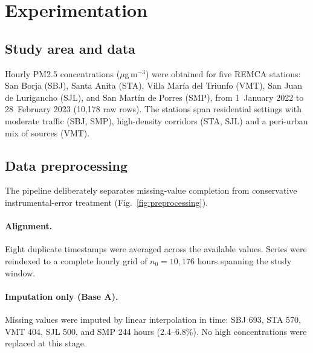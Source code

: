 \documentclass[12pt,letterpaper]{article}
\begin{document}
\section{Experimentation}
\label{sec:methods}

\subsection{Study area and data}
\label{subsec:data}

Hourly PM2.5 concentrations ($\mu$g\,m$^{-3}$) were obtained for five REMCA stations: San Borja (SBJ), Santa Anita (STA), Villa Mar\'ia del Triunfo (VMT), San Juan de Lurigancho (SJL), and San Mart\'in de Porres (SMP), from 1~January 2022 to 28~February 2023 (10{,}178 raw rows). The stations span residential settings with moderate traffic (SBJ, SMP), high-density corridors (STA, SJL) and a peri-urban mix of sources (VMT).

\subsection{Data preprocessing}
\label{subsec:preproc}

The pipeline deliberately separates missing-value completion from conservative instrumental-error treatment (Fig.~\ref{fig:preprocessing}).

\paragraph{Alignment.}
Eight duplicate timestamps were averaged across the available values. Series were reindexed to a complete hourly grid of $n_0=10{,}176$ hours spanning the study window.

\paragraph{Imputation only (Base A).}
Missing values were imputed by linear interpolation in time: SBJ 693, STA 570, VMT 404, SJL 500, and SMP 244 hours (2.4--6.8\%). No high concentrations were replaced at this stage.
\end{document}
